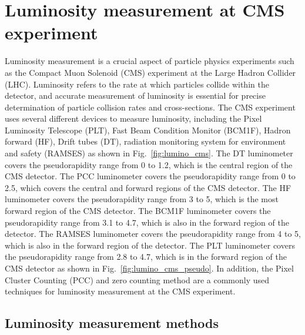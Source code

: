 \chapter{Luminosity measurement at CMS experiment}  %

\ifpdf
    \graphicspath{{Chapter2/Figs/Raster/}{Chapter2/Figs/PDF/}{Chapter2/Figs/}}
\else
    \graphicspath{{Chapter2/Figs/Vector/}{Chapter2/Figs/}}
\fi


Luminosity measurement is a crucial aspect of particle physics experiments such as the Compact Muon Solenoid (CMS) experiment at the Large Hadron Collider (LHC). Luminosity refers to the rate at which particles collide within the detector, and accurate measurement of luminosity is essential for precise determination of particle collision rates and cross-sections. The CMS experiment uses several different devices to measure luminosity, including the Pixel Luminosity Telescope (PLT), Fast Beam Condition Monitor (BCM1F), Hadron forward (HF), Drift tubes (DT), radiation monitoring system for environment and safety (RAMSES) as shown in Fig.~\ref{fig:lumino_cms}. The DT luminometer covers the pseudorapidity range from 0 to 1.2, which is the central region of the CMS detector. The PCC luminometer covers the pseudorapidity range from 0 to 2.5, which covers the central and forward regions of the CMS detector. The HF luminometer covers the pseudorapidity range from 3 to 5, which is the most forward region of the CMS detector. The BCM1F luminometer covers the pseudorapidity range from 3.1 to 4.7, which is also in the forward region of the detector. The RAMSES luminometer covers the pseudorapidity range from 4 to 5, which is also in the forward region of the detector. The PLT luminometer covers the pseudorapidity range from 2.8 to 4.7, which is in the forward region of the CMS detector as shown in Fig.~\ref{fig:lumino_cms_pseudo}. In addition, the Pixel Cluster Counting (PCC) and zero counting method are a commonly used techniques for luminosity measurement at the CMS experiment.

\section{Luminosity measurement methods}

